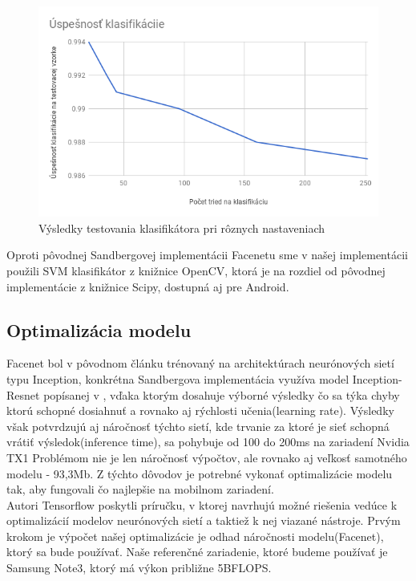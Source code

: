 \begin{figure}[H]
	\centering
	\includegraphics[width=1\linewidth]{img/chart}
	\caption{Výsledky testovania klasifikátora pri rôznych nastaveniach}
	\label{fig:chart}
\end{figure}

\indent Oproti pôvodnej Sandbergovej implementácii Facenetu sme v našej implementácii použili SVM klasifikátor z knižnice OpenCV, ktorá je na rozdiel od pôvodnej implementácie z knižnice Scipy, dostupná aj pre Android.


\subsection{Optimalizácia modelu}\label{l:opt}
Facenet bol v pôvodnom článku \cite{schroff2015facenet} trénovaný na architektúrach neurónových sietí typu Inception, konkrétna Sandbergova implementácia využíva model Inception-Resnet popísanej v \cite{SzegedyIV16}, vďaka ktorým dosahuje výborné výsledky čo sa týka chyby ktorú schopné dosiahnuť a rovnako aj rýchlosti učenia(learning rate).
Výsledky \cite{canziani2016analysis} však potvrdzujú aj náročnosť týchto sietí, kde trvanie za ktoré je sieť schopná vrátiť výsledok(inference time), sa pohybuje od 100 do 200ms na zariadení Nvidia TX1
Problémom nie je len náročnosť výpočtov, ale rovnako aj veľkosť samotného modelu - 93,3Mb.
Z týchto dôvodov je potrebné vykonať optimalizácie modelu tak, aby fungovali čo najlepšie na mobilnom zariadení. \\

\indent Autori Tensorflow poskytli príručku\cite{Optimizi3}, v ktorej navrhujú možné riešenia vedúce k optimalizácií modelov neurónových sietí a taktiež k nej viazané nástroje.
Prvým krokom je výpočet našej optimalizácie je odhad náročnosti modelu(Facenet), ktorý sa bude používať.
Naše referenčné zariadenie, ktoré budeme používať je Samsung Note3, ktorý má výkon približne 5BFLOPS. 


